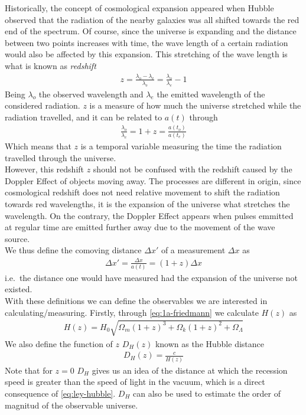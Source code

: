 Historically, the concept of cosmological expansion appeared when Hubble observed that the radiation of the nearby galaxies was all shifted towards the red end of the spectrum. Of course, since the universe is expanding and the distance between two points increases with time, the wave length of a certain radiation would also be affected by this expansion. This stretching of the wave length is what is known as \textit{redshift} 
\begin{align}
	z = \frac{\lambda_{\text{o}} - \lambda_{\text{e}}}{\lambda_{\text{e}}} = \frac{\lambda_o}{\lambda_e} - 1
	\label{eq:redshift}
\end{align}
Being $\lambda_o$ the observed wavelength and $\lambda_e$ the emitted wavelength of the considered radiation. $z$ is a measure of how much the universe stretched while the radiation travelled, and it can be related to $a(t)$ through 
\begin{align}
	\frac{\lambda_o}{\lambda_e} = 1+z = \frac{a(t_o)}{a(t_e)}
\end{align}
Which means that $z$ is a temporal variable measuring the time the radiation travelled through the universe. \\

However, this redshift $z$ should not be confused with the redshift caused by the Doppler Effect of objects moving away. The processes are different in origin, since cosmological redshift does not need relative movement to shift the radiation towards red wavelengths, it is the expansion of the universe what stretches the wavelength. On the contrary, the Doppler Effect appears when pulses emmitted at regular time are emitted further away due to the movement of the wave source. \\

We thus define the comoving distance $\Delta x'$ of a measurement $\Delta x$ as 
\begin{align}
	\Delta x' =\frac{\Delta x}{a(t)}= (1+z)\Delta x
\end{align}
i.e.\ the distance one would have measured had the expansion of the universe not existed. \\

With these definitions we can define  the observables we are interested in calculating/measuring. Firstly, through \eqref{eq:1a-friedmann} we calculate $H(z)$ as  
\begin{align}
	H(z) = H_0 \sqrt{\Omega_m(1+z)^3 + \Omega_k(1+z)^2 + \Omega_\Lambda} 
\end{align}
We also define the function of $z$ $D_H(z)$ known as the Hubble distance
\begin{align}
	D_H(z)  = \frac{c}{H(z)}
	\label{eq:DH-definition}
\end{align}
Note that for $z = 0$ $D_H$ gives us an idea of the distance at which the recession speed is greater than the speed of light in the vacuum, which is a direct consequence of \eqref{eq:ley-hubble}. $D_H$ can also be used to estimate the order of magnitud of the observable universe. \\

